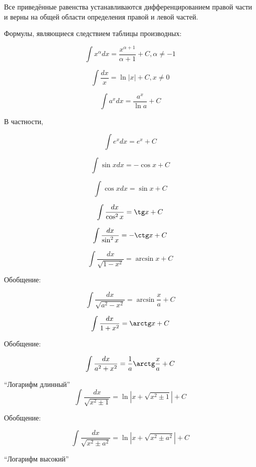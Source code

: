 Все приведённые равенства устанавливаются дифференцированием правой части и верны на общей области определения правой и левой частей.

Формулы, являющиеся следствием таблицы производных:

\begin{list}{.}{}

\item
$$
\int x^\alpha dx= \frac{x^{\alpha+1}}{\alpha+1}+C, \alpha \neq -1
$$

\item
$$
\int \frac{dx}{x}= \ln|x|+C, x\neq 0
$$

\item
$$
\int a^x dx= \frac{a^x}{\ln a}+C
$$

В частности,

$$
\int e^x dx= e^x +C
$$

\item
$$
\int \sin x dx= -\cos x+C
$$

\item
$$
\int \cos x dx= \sin x+C
$$

\item
$$
\int \frac{dx}{\cos^2 x}= \tg x +C
$$

\item
$$
\int \frac{dx}{\sin^2 x}= -\ctg x +C
$$

\item
$$
\int \frac{dx}{\sqrt{1-x^2}}= \arcsin x+C
$$

Обобщение:

$$
\int \frac{dx}{\sqrt{a^2-x^2}}= \arcsin \frac{x}{a}+C
$$

\item
$$
\int \frac{dx}{1+x^2}= \arctg x+C
$$

Обобщение:

$$
\int \frac{dx}{a^2+x^2}= \frac{1}{a} \arctg \frac{x}{a}+C
$$


\item

``Логарифм длинный''
$$
\int \frac{dx}{\sqrt{x^2 \pm 1}}= \ln|x+\sqrt{x^2 \pm 1}|+C
$$

Обобщение:

$$
\int \frac{dx}{\sqrt{x^2 \pm a^2}}= \ln|x+\sqrt{x^2 \pm a^2}|+C
$$

\item

``Логарифм высокий''


\end{list}
